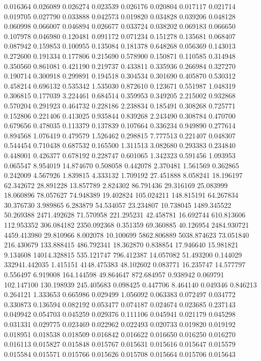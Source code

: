 0.016364
0.026089
0.026274
0.023539
0.026176
0.020804
0.017117
0.021714
0.019705
0.027790
0.033888
0.042573
0.019820
0.034828
0.039206
0.048128
0.060998
0.066007
0.046894
0.026677
0.033724
0.038202
0.069183
0.066650
0.107978
0.046980
0.120481
0.091172
0.071234
0.151278
0.135681
0.068407
0.087942
0.159853
0.100955
0.135084
0.181378
0.648268
0.056369
0.143013
0.272600
0.191334
0.177806
0.215690
0.578900
0.150871
0.110585
0.314948
0.350560
0.861081
0.421190
0.219737
0.433811
0.335936
0.266984
0.327270
0.190714
0.300918
0.299891
0.194518
0.304534
0.301690
0.405870
0.530312
0.458214
0.696132
0.535342
1.535030
0.872610
0.123671
0.551987
1.048319
0.306815
0.177039
3.224461
0.684514
0.359953
0.349205
2.215002
0.932868
0.570204
0.291923
0.464732
0.228186
2.238834
0.185491
0.308268
0.725771
0.152806
0.221406
0.413025
0.935844
0.839268
2.243490
0.308784
0.470700
0.679656
0.478035
0.113379
0.137839
0.107664
0.336234
0.949890
0.277614
0.894568
1.076419
0.479579
1.526462
0.298815
7.777513
0.221407
0.048307
0.544454
0.710438
0.687532
0.165500
1.311513
3.082680
0.293383
0.234840
0.448001
0.426377
0.678192
0.228747
0.601065
1.342323
0.591456
1.093953
0.065547
8.954019
14.874670
0.508058
0.442078
2.370481
1.561569
0.362865
0.242009
4.567926
1.839815
4.333132
1.709192
27.451888
8.058241
18.196197
62.342672
28.891228
13.857789
2.824302
86.791436
29.316169
25.083999
18.060896
78.057627
74.948389
19.402824
105.024211
148.815191
64.267834
30.376730
3.989865
6.283879
54.534057
23.234807
10.738045
1489.345522
50.269388
2471.492628
71.570958
221.295231
42.458781
16.692744
610.813606
112.953352
306.084182
2350.092368
0.351359
69.360885
40.126954
2484.930721
4459.413980
29.810966
8.002078
10.100699
5862.806889
5038.874623
73.051840
216.430679
133.888415
486.792341
18.362870
0.838854
17.946640
15.981821
9.134608
14014.328815
535.121747
796.412387
14.057082
51.493200
0.144029
332941.442035
1.415151
4148.475383
48.102602
0.083771
16.235747
14.577797
0.556497
6.919008
164.144598
49.864647
872.684957
0.938942
0.069791
102.147100
130.198939
245.405683
0.098425
0.447706
8.464140
0.049346
0.846213
0.264121
1.333653
0.665986
0.029499
1.056092
0.063383
0.072497
0.034772
0.330873
0.136594
0.082192
0.053477
0.074187
0.024674
0.023685
0.237143
0.049942
0.054703
0.045259
0.029376
0.111106
0.045941
0.021179
0.045298
0.031331
0.029775
0.023469
0.022962
0.022493
0.020733
0.019820
0.019192
0.018951
0.018538
0.018509
0.016842
0.016622
0.016650
0.016250
0.016270
0.016113
0.015827
0.015848
0.015767
0.015631
0.015616
0.015647
0.015579
0.015584
0.015571
0.015766
0.015626
0.015708
0.015664
0.015706
0.015643
